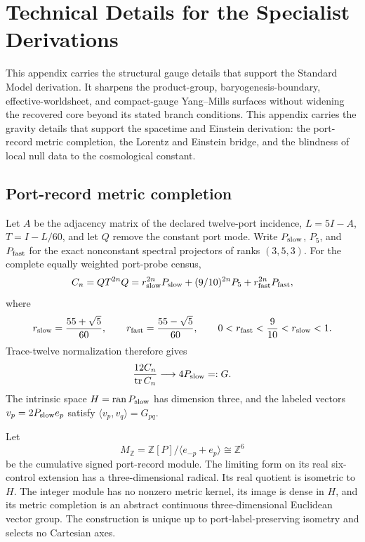 \section{Technical Details for the Specialist Derivations}
\label{app:derivation-technical-port}

\ifdefined\OPHSkipEinsteinChain
This appendix carries the structural gauge details that support the Standard Model derivation.
It sharpens the product-group, baryogenesis-boundary, effective-worldsheet, and compact-gauge
Yang--Mills surfaces without widening the recovered core beyond its stated branch conditions.
\else
This appendix carries the gravity details that support the spacetime and Einstein derivation:
the port-record metric completion, the Lorentz and Einstein bridge, and the blindness of local
null data to the cosmological constant.
\fi

\ifdefined\OPHSkipEinsteinChain
\else
\subsection{Port-record metric completion}

\begin{theorem}
Let \(A\) be the adjacency matrix of the declared twelve-port incidence,
\(L=5I-A\), \(T=I-L/60\), and let \(Q\) remove the constant port mode. Write
\(P_{\rm slow}\), \(P_5\), and \(P_{\rm fast}\) for the exact nonconstant
spectral projectors of ranks \((3,5,3)\). For the complete equally weighted
port-probe census,
\[
C_n=QT^{2n}Q
=r_{\rm slow}^{2n}P_{\rm slow}
 +(9/10)^{2n}P_5
 +r_{\rm fast}^{2n}P_{\rm fast},
\]
where
\[
r_{\rm slow}=\frac{55+\sqrt5}{60},\qquad
r_{\rm fast}=\frac{55-\sqrt5}{60},\qquad
0<r_{\rm fast}<\frac9{10}<r_{\rm slow}<1.
\]
Trace-twelve normalization therefore gives
\[
\frac{12C_n}{\operatorname{tr}C_n}
\longrightarrow 4P_{\rm slow}=:G.
\]
The intrinsic space \(H=\operatorname{ran}P_{\rm slow}\) has dimension three,
and the labeled vectors \(v_p=2P_{\rm slow}e_p\) satisfy
\(\langle v_p,v_q\rangle=G_{pq}\).

Let
\[
M_{\mathbb Z}=\mathbb Z[P]/\langle e_{-p}+e_p\rangle\cong\mathbb Z^6
\]
be the cumulative signed port-record module. The limiting form on its real
six-control extension has a three-dimensional radical. Its real quotient is
isometric to \(H\). The integer module has no nonzero metric kernel, its image
is dense in \(H\), and its metric completion is an abstract continuous
three-dimensional Euclidean vector group. The construction is unique up to
port-label-preserving isometry and selects no Cartesian axes.
\end{theorem}

